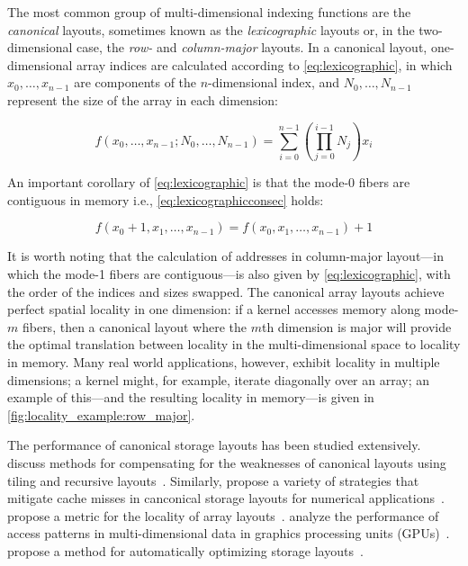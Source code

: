 The most common group of multi-dimensional indexing functions are the \emph{canonical} layouts, sometimes known as the \emph{lexicographic} layouts or, in the two-dimensional case, the \emph{row-} and \emph{column-major} layouts. In a canonical layout, one-dimensional array indices are calculated according to \cref{eq:lexicographic}, in which $x_0, \ldots, x_{n-1}$ are components of the $n$-dimensional index, and $N_0, \ldots, N_{n-1}$ represent the size of the array in each dimension:

\begin{equation}
\label{eq:lexicographic}
f(x_0, \ldots, x_{n-1}; N_0, \ldots, N_{n-1}) = \sum_{i=0}^{n-1}\left(\prod_{j=0}^{i-1}N_j\right)x_i
\end{equation}

An important corollary of \cref{eq:lexicographic} is that the mode-0 fibers are contiguous in memory i.e., \cref{eq:lexicographicconsec} holds:

\begin{equation}
\label{eq:lexicographicconsec}
f(x_0 + 1, x_1, \ldots, x_{n-1}) = f(x_0, x_1, \ldots, x_{n-1}) + 1
\end{equation}

It is worth noting that the calculation of addresses in column-major layout---in which the mode-1 fibers are contiguous---is also given by \cref{eq:lexicographic}, with the order of the indices and sizes swapped. The canonical array layouts achieve perfect spatial locality in one dimension: if a kernel accesses memory along mode-$m$ fibers, then a canonical layout where the $m$th dimension is major will provide the optimal translation between locality in the multi-dimensional space to locality in memory. Many real world applications, however, exhibit locality in multiple dimensions; a kernel might, for example, iterate diagonally over an array; an example of this---and the resulting locality in memory---is given in \cref{fig:locality_example:row_major}.

The performance of canonical storage layouts has been studied extensively.
\citeauthor{1214317} discuss methods for compensating for the weaknesses of canonical layouts using tiling and recursive layouts~\cite{1214317}.
Similarly, \citeauthor{kowarschik2003overview} propose a variety of strategies that mitigate cache misses in canconical storage layouts for numerical applications~\cite{kowarschik2003overview}.
\citeauthor{1560002} propose a metric for the locality of array layouts~\cite{1560002}.
\citeauthor{5473222} analyze the performance of access patterns in multi-dimensional data in graphics processing units (GPUs)~\cite{5473222}. \citeauthor{10.1145/2063384.2063401} propose a method for automatically optimizing storage layouts~\cite{10.1145/2063384.2063401}.

